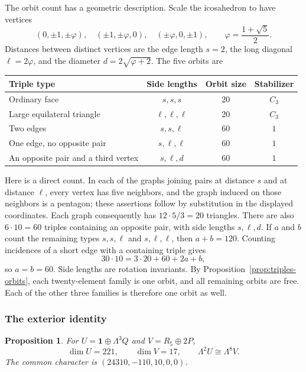 \documentclass[11pt,a4paper]{article}
\newtheorem{proposition}{Proposition}[section]
\begin{document}
The orbit count has a geometric description. Scale the icosahedron to
have vertices
\[
(0,\pm1,\pm\varphi),\quad
(\pm1,\pm\varphi,0),\quad
(\pm\varphi,0,\pm1),\qquad
\varphi=\frac{1+\sqrt5}{2}.
\]
Distances between distinct vertices are the edge length $s=2$, the
long diagonal $\ell=2\varphi$, and the diameter
$d=2\sqrt{\varphi+2}$. The five orbits are
\begin{center}\small
\begin{tabular}{lccc}
\toprule
Triple type & Side lengths & Orbit size & Stabilizer\\\midrule
Ordinary face & $s,s,s$ &20&$C_3$\\
Large equilateral triangle & $\ell,\ell,\ell$ &20&$C_3$\\
Two edges & $s,s,\ell$ &60&$1$\\
One edge, no opposite pair & $s,\ell,\ell$ &60&$1$\\
An opposite pair and a third vertex & $s,\ell,d$ &60&$1$\\\bottomrule
\end{tabular}
\end{center}
Here is a direct count. In each of the graphs joining pairs at distance
$s$ and at distance $\ell$, every vertex has five neighbors, and the
graph induced on those neighbors is a pentagon; these assertions follow
by substitution in the displayed coordinates. Each graph consequently
has $12\cdot5/3=20$ triangles. There are also $6\cdot10=60$ triples
containing an opposite pair, with side lengths $s,\ell,d$.
If $a$ and $b$ count the remaining types $s,s,\ell$ and
$s,\ell,\ell$, then $a+b=120$. Counting incidences of a short edge
with a containing triple gives
\[
30\cdot10=3\cdot20+60+2a+b,
\]
so $a=b=60$. Side lengths are rotation invariants. By
Proposition~\ref{prop:triples-orbits}, each twenty-element family is
one orbit, and all remaining orbits are free. Each of the other three
families is therefore one orbit as well.

\subsubsection*{The exterior identity}

\begin{proposition}\label{prop:triples-identity}
For $U=\mathbf1\oplus\Lambda^3Q$ and $V=R_5\oplus2P$,
\[
\dim U=221,\qquad \dim V=17,\qquad
\Lambda^2U\cong\Lambda^8V.
\]
The common character is $(24310,-110,10,0,0)$.
\end{proposition}
\end{document}
